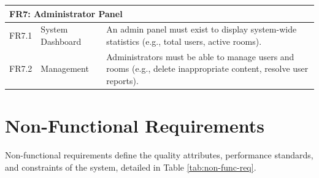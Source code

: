 \begin{longtable}{l l p{8.5cm}}
\multicolumn{3}{l}{\textbf{FR7: Administrator Panel}} \\
\midrule
FR7.1 & System Dashboard & An admin panel must exist to display system-wide statistics (e.g., total users, active rooms). \\
FR7.2 & Management & Administrators must be able to manage users and rooms (e.g., delete inappropriate content, resolve user reports). \\
\end{longtable}

\section{Non-Functional Requirements}
\label{sec:non-func-req}
Non-functional requirements define the quality attributes, performance standards, and constraints of the system, detailed in Table \ref{tab:non-func-req}.

